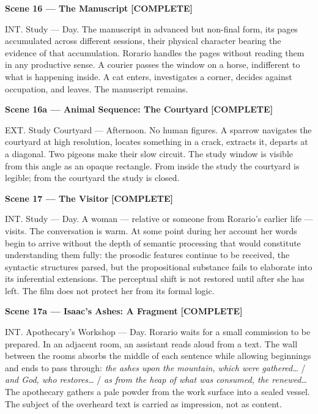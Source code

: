 \documentclass[12pt, oneside]{amsart}
\newcommand{\statuscomplete}{{\small\bfseries\color{complete}[COMPLETE]}}
\begin{document}
\bigskip

\noindent\textbf{Scene 16 --- The Manuscript} \statuscomplete

\noindent INT. Study --- Day. The manuscript in advanced but non-final form, its pages accumulated across different sessions, their physical character bearing the evidence of that accumulation. Rorario handles the pages without reading them in any productive sense. A courier passes the window on a horse, indifferent to what is happening inside. A cat enters, investigates a corner, decides against occupation, and leaves. The manuscript remains.

\bigskip

\noindent\textbf{Scene 16a --- Animal Sequence: The Courtyard} \statuscomplete

\noindent EXT. Study Courtyard --- Afternoon. No human figures. A sparrow navigates the courtyard at high resolution, locates something in a crack, extracts it, departs at a diagonal. Two pigeons make their slow circuit. The study window is visible from this angle as an opaque rectangle. From inside the study the courtyard is legible; from the courtyard the study is closed.

\bigskip

\noindent\textbf{Scene 17 --- The Visitor} \statuscomplete

\noindent INT. Study --- Day. A woman --- relative or someone from Rorario's earlier life --- visits. The conversation is warm. At some point during her account her words begin to arrive without the depth of semantic processing that would constitute understanding them fully: the prosodic features continue to be received, the syntactic structures parsed, but the propositional substance fails to elaborate into its inferential extensions. The perceptual shift is not restored until after she has left. The film does not protect her from its formal logic.

\bigskip

\noindent\textbf{Scene 17a --- Isaac's Ashes: A Fragment} \statuscomplete

\noindent INT. Apothecary's Workshop --- Day. Rorario waits for a small commission to be prepared. In an adjacent room, an assistant reads aloud from a text. The wall between the rooms absorbs the middle of each sentence while allowing beginnings and ends to pass through: \textit{the ashes upon the mountain, which were gathered\ldots} / \textit{and God, who restores\ldots} / \textit{as from the heap of what was consumed, the renewed\ldots} The apothecary gathers a pale powder from the work surface into a sealed vessel. The subject of the overheard text is carried as impression, not as content.
\end{document}
